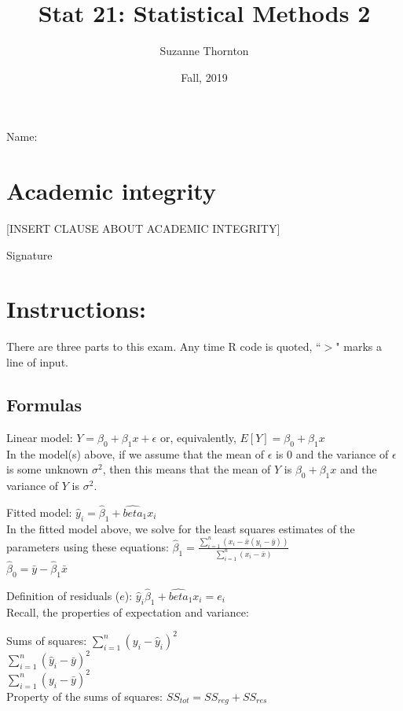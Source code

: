 \documentclass[11pt]{article}
\title{Stat 21: Statistical Methods 2}
\author{Suzanne Thornton}
\date{Fall, 2019}
\begin{document}
\begin{flushright} 
	Name: \underline{\hspace{5cm}} 
	\end{flushright} 


\section*{Academic integrity }
[INSERT CLAUSE ABOUT ACADEMIC INTEGRITY]
\begin{flushright}
Signature{} \underline{\hspace{5cm}}      
\end{flushright}

\section*{Instructions:} There are three parts to this exam. Any time R code is quoted, ``$>$" marks a line of input.
\bigskip

\subsection*{Formulas}
Linear model: $Y = \beta_0 + \beta_1 x + \epsilon$  or, equivalently, $E[Y] = \beta_0 + \beta_1 x$\\
In the model(s) above, if we assume that the mean of $\epsilon$ is $0$ and the variance of $\epsilon$ is some unknown $\sigma^2$, then this means that the mean of $Y$ is $\beta_0 + \beta_1x$ and the variance of $Y$ is $\sigma^2$.


Fitted model: $\hat{y}_{i} = \hat{\beta}_1 + \hat{beta}_1x_i $\\
In the fitted model above, we solve for the least squares estimates of the parameters using these equations: 
$\hat{\beta}_1 = \frac{\sum_{i=1}^n(x_i-\bar{x}(y_i-\bar{y}))}{\sum_{i=1}^n(x_i-\bar{x})}$ \\
$\hat{\beta}_0 = \bar{y} - \hat{\beta}_1\bar{x}$

Definition of residuals ($e$): $\hat{y}_{i}  \hat{\beta}_1 + \hat{beta}_1x_i = e_i$\\

Recall, the properties of expectation and variance: 


Sums of squares: $\sum_{i=1}^{n}(y_i - \hat{y}_i)^2$\\
$\sum_{i=1}^{n}(\hat{y}_i-\bar{y})^2$\\
$\sum_{i=1}^{n}(y_i - \bar{y})^2$\\
Property of the sums of squares: $SS_{tot} = SS_{reg} + SS_{res}$
\end{document}

